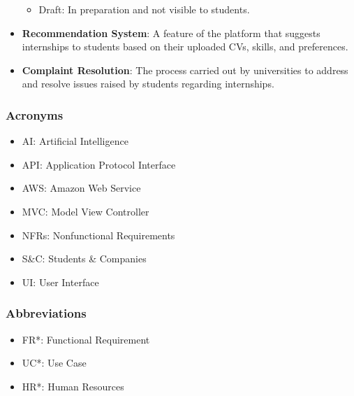 \begin{itemize}
\begin{itemize}
            \item Draft: In preparation and not visible to students.
        \end{itemize}
    \item \textbf{Recommendation System}: A feature of the platform that suggests internships to students based on their uploaded CVs, skills, and preferences.
    \item \textbf{Complaint Resolution}: The process carried out by universities to address and resolve issues raised by students regarding internships.

\end{itemize}

\subsubsection{Acronyms}
\begin{itemize}
    \item AI: Artificial Intelligence
    \item API: Application Protocol Interface
    \item AWS: Amazon Web Service
    \item MVC: Model View Controller 
    \item NFRs: Nonfunctional Requirements
    \item S\&C: Students \& Companies
    \item UI: User Interface
\end{itemize}
\subsubsection{Abbreviations}
\begin{itemize}
    \item FR*: Functional Requirement
    \item UC*: Use Case
    \item HR*: Human Resources
\end{itemize}
